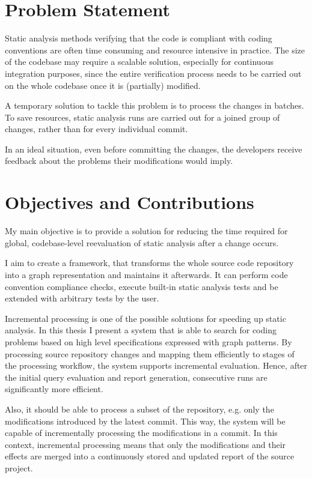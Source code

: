\section{Problem Statement}

Static analysis methods verifying that the code is compliant with coding conventions are often time consuming and resource intensive in practice. The size of the codebase may require a scalable solution, especially for continuous integration purposes, since the entire verification process needs to be carried out on the whole codebase once it is (partially) modified.

A temporary solution to tackle this problem is to process the changes in batches. To save resources, static analysis runs are carried out for a joined group of changes, rather than for every individual commit.

In an ideal situation, even before committing the changes, the developers receive feedback about the problems their modifications would imply.


\section{Objectives and Contributions}

My main objective is to provide a solution for reducing the time required for global, codebase-level reevaluation of static analysis after a change occurs.

I aim to create a framework, that transforms the whole source code repository into a graph representation and maintains it afterwards. It can perform code convention compliance checks, execute built-in static analysis tests and be extended with arbitrary tests by the user.




Incremental processing is one of the possible solutions for speeding up static analysis. In this thesis I present a system that is able to search for coding problems based on high level specifications expressed with graph patterns. By processing source repository changes and mapping them efficiently to stages of the processing workflow, the system supports incremental evaluation. Hence, after the initial query evaluation and report generation, consecutive runs are significantly more efficient.


Also, it should be able to process a subset of the repository, e.g. only the modifications introduced by the latest commit. This way, the system will be capable of incrementally processing the modifications in a commit. In this context, incremental processing means that only the modifications and their effects are merged into a continuously stored and updated report of the source project.

